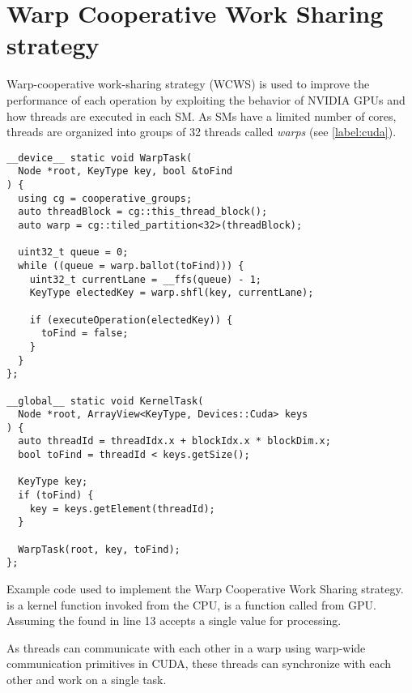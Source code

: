 \section{Warp Cooperative Work Sharing strategy}

Warp-cooperative work-sharing strategy (WCWS) is used to improve the performance of each operation by exploiting the behavior of NVIDIA GPUs and how threads are executed in each SM. As SMs have a limited number of cores, threads are organized into groups of 32 threads called \textit{warps} (see \cref{label:cuda}).

\begin{listing}
  \begin{verbatim}
__device__ static void WarpTask(
  Node *root, KeyType key, bool &toFind
) {
  using cg = cooperative_groups;
  auto threadBlock = cg::this_thread_block();
  auto warp = cg::tiled_partition<32>(threadBlock);

  uint32_t queue = 0;
  while ((queue = warp.ballot(toFind))) {
    uint32_t currentLane = __ffs(queue) - 1;
    KeyType electedKey = warp.shfl(key, currentLane);

    if (executeOperation(electedKey)) {
      toFind = false;
    }
  }
};

__global__ static void KernelTask(
  Node *root, ArrayView<KeyType, Devices::Cuda> keys
) {
  auto threadId = threadIdx.x + blockIdx.x * blockDim.x;
  bool toFind = threadId < keys.getSize();

  KeyType key;
  if (toFind) {
    key = keys.getElement(threadId);
  }

  WarpTask(root, key, toFind);
};
  \end{verbatim}
  \caption{Example code used to implement the Warp Cooperative Work Sharing strategy.  is a kernel function invoked from the CPU,  is a function called from GPU. Assuming the  found in line 13 accepts a single value for processing.}
  \label{lst:wcws}
\end{listing}

As threads can communicate with each other in a warp using warp-wide communication primitives in CUDA, these threads can synchronize with each other and work on a single task.


